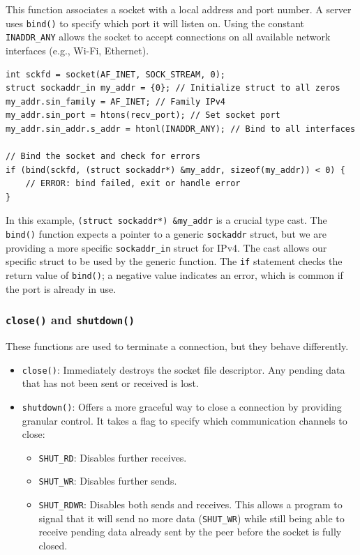 \documentclass{article}
\begin{document}
This function associates a socket with a local address and port number. A server uses \texttt{bind()} to specify which port it will listen on. Using the constant \texttt{INADDR\_ANY} allows the socket to accept connections on all available network interfaces (e.g., Wi-Fi, Ethernet).

\begin{verbatim}
int sckfd = socket(AF_INET, SOCK_STREAM, 0);
struct sockaddr_in my_addr = {0}; // Initialize struct to all zeros
my_addr.sin_family = AF_INET; // Family IPv4
my_addr.sin_port = htons(recv_port); // Set socket port
my_addr.sin_addr.s_addr = htonl(INADDR_ANY); // Bind to all interfaces

// Bind the socket and check for errors
if (bind(sckfd, (struct sockaddr*) &my_addr, sizeof(my_addr)) < 0) {
    // ERROR: bind failed, exit or handle error
}
\end{verbatim}

In this example, \texttt{(struct sockaddr*) \&my\_addr} is a crucial type cast. The \texttt{bind()} function expects a pointer to a generic \texttt{sockaddr} struct, but we are providing a more specific \texttt{sockaddr\_in} struct for IPv4. The cast allows our specific struct to be used by the generic function. The \texttt{if} statement checks the return value of \texttt{bind()}; a negative value indicates an error, which is common if the port is already in use.

\subsubsection[close() and shutdown() functions]{\texttt{close()} and \texttt{shutdown()}}

These functions are used to terminate a connection, but they behave differently.

\begin{itemize}
    \item \texttt{close()}: Immediately destroys the socket file descriptor. Any pending data that has not been sent or received is lost.
    \item \texttt{shutdown()}: Offers a more graceful way to close a connection by providing granular control. It takes a flag to specify which communication channels to close:
    \begin{itemize}
        \item \texttt{SHUT\_RD}: Disables further receives.
        \item \texttt{SHUT\_WR}: Disables further sends.
        \item \texttt{SHUT\_RDWR}: Disables both sends and receives. This allows a program to signal that it will send no more data (\texttt{SHUT\_WR}) while still being able to receive pending data already sent by the peer before the socket is fully closed.
    \end{itemize}
\end{itemize}
\end{document}
